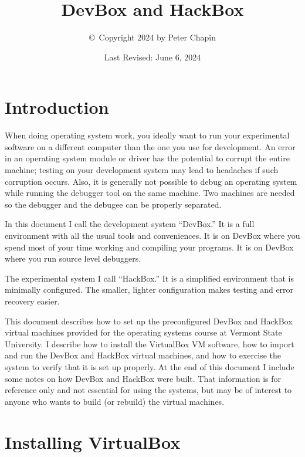\documentclass{article}
\begin{document}
\title{DevBox and HackBox}
\author{\copyright\ Copyright 2024 by Peter Chapin}
\date{Last Revised: June 6, 2024}
\maketitle

\tableofcontents

\section{Introduction}

When doing operating system work, you ideally want to run your experimental software on a
different computer than the one you use for development. An error in an operating system module
or driver has the potential to corrupt the entire machine; testing on your development system
may lead to headaches if such corruption occurs. Also, it is generally not possible to debug an
operating system while running the debugger tool on the same machine. Two machines are needed so
the debugger and the debugee can be properly separated.

In this document I call the development system ``DevBox.'' It is a full environment with all the
usual tools and conveniences. It is on DevBox where you spend most of your time working and
compiling your programs. It is on DevBox where you run source level debuggers.

The experimental system I call ``HackBox.'' It is a simplified environment that is minimally
configured. The smaller, lighter configuration makes testing and error recovery easier.

This document describes how to set up the preconfigured DevBox and HackBox virtual machines
provided for the operating systems course at Vermont State University. I describe how to install
the VirtualBox VM software, how to import and run the DevBox and HackBox virtual machines, and
how to exercise the system to verify that it is set up properly. At the end of this document I
include some notes on how DevBox and HackBox were built. That information is for reference only
and not essential for using the systems, but may be of interest to anyone who wants to build (or
rebuild) the virtual machines.

\section{Installing VirtualBox}
\end{document}

